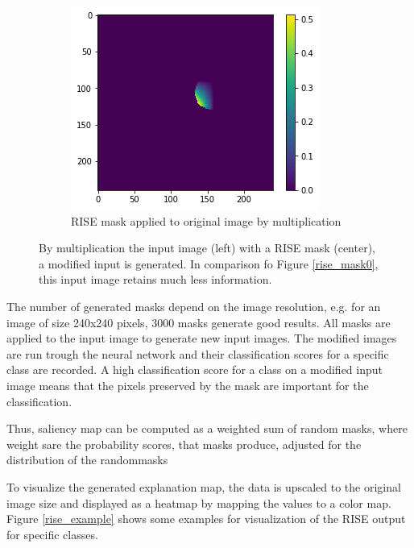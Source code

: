 \begin{figure}[H]
\begin{subfigure}[t]{.32\textwidth}
    \end{subfigure}\hfill%
    \begin{subfigure}[t]{.32\textwidth}
        \centering
        \includegraphics[width=\linewidth]{chapters/02_methods/images/rise/rise1_applied.png}
        \caption{RISE mask applied to original image by multiplication}
    \end{subfigure}
    \caption{By multiplication the input image (left) with a RISE mask (center), a modified input is generated. In comparison fo Figure \ref{rise_mask0}, this input image retains much less information.}
    \label{rise_mask1}
\end{figure}

The number of generated masks depend on the image resolution, e.g. for an image of size 240x240 pixels, 3000 masks generate good results. All masks are applied to the input image to generate new input images. The modified images are run trough the neural network and their classification scores for a specific class are recorded. A high classification score for a class on a modified input image means that the pixels preserved by the mask are important for the classification.

Thus, saliency map can be computed as a weighted sum of random masks, where weight sare the probability scores, that masks produce, adjusted for the distribution of the randommasks

To visualize the generated explanation map, the data is upscaled to the original image size and displayed as a heatmap by mapping the values to a color map. Figure \ref{rise_example} shows some examples for visualization of the RISE output for specific classes.

